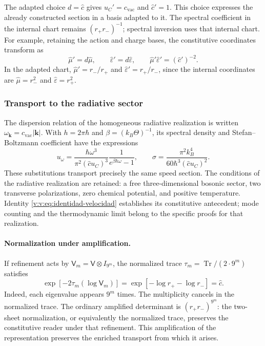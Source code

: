 The adapted choice $d=\widehat c$ gives $u_C'=c_{\mathrm{vac}}$ and
$\widehat c'=1$. This choice expresses the already constructed section in a
basis adapted to it. The spectral coefficient in the internal chart remains
$(r_+r_-)^{-1}$; spectral inversion uses that internal chart.
For example, retaining the action and charge bases, the constitutive
coordinates transform as
\[
 \widehat\mu'=d\widehat\mu,
 \qquad \widehat\varepsilon'=d\widehat\varepsilon,
 \qquad
 \widehat\mu'\widehat\varepsilon'=(\widehat c')^{-2}.
\]
In the adapted chart, $\widehat\mu'=r_-/r_+$ and
$\widehat\varepsilon'=r_+/r_-$, since the internal coordinates are
$\widehat\mu=r_-^2$ and $\widehat\varepsilon=r_+^2$.

\subsubsection{Transport to the radiative sector}

The dispersion relation of the homogeneous radiative realization is written
$\omega_{\symbf{k}}=c_{\mathrm{vac}}|\symbf{k}|$.
With $h=2\pi\hbar$ and $\beta=(k_B\Theta)^{-1}$, its spectral density
and Stefan--Boltzmann coefficient have the expressions
\begin{equation}
 u_\omega=
 \frac{\hbar\omega^3}{\pi^2(\widehat c u_C)^3}
 \frac{1}{e^{\beta\hbar\omega}-1},
 \qquad
 \sigma=\frac{\pi^2k_B^4}{60\hbar^3(\widehat c u_C)^2}.
 \label{v:v:eq:radiacion-velocidad-constitutiva}
\end{equation}
These substitutions transport precisely the same speed
section. The conditions of the radiative realization are retained:
a free three-dimensional bosonic sector, two transverse polarizations,
zero chemical potential, and positive temperature. Identity
\eqref{v:v:eq:identidad-velocidad} establishes its constitutive antecedent;
mode counting and the thermodynamic limit belong to the specific
proofs for that realization.

\paragraph{Normalization under amplification.}
If refinement acts by $\mathsf V_m=\mathsf V\otimes I_{9^m}$,
the normalized trace $\tau_m=\operatorname{Tr}/(2\cdot9^m)$ satisfies
\[
 \exp[-2\tau_m(\log\mathsf V_m)]
 =\exp[-\log r_+-\log r_-]=\widehat c.
\]
Indeed, each eigenvalue appears $9^m$ times. The multiplicity
cancels in the normalized trace. The ordinary amplified determinant is
$(r_+r_-)^{9^m}$: the two-sheet normalization, or equivalently the
normalized trace, preserves the constitutive reader under that
refinement. This amplification of the representation preserves the
enriched transport from which it arises.

